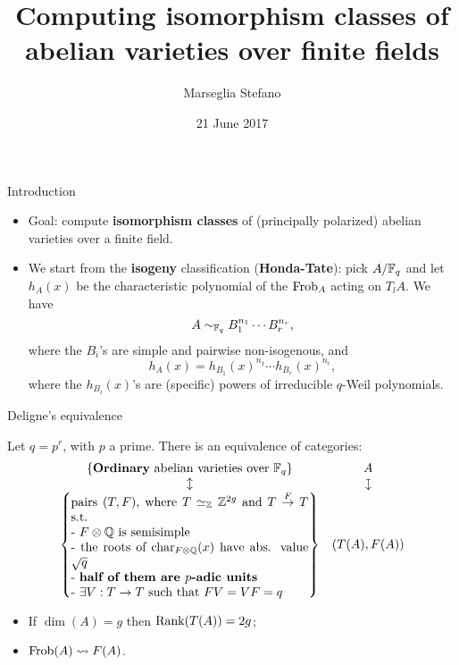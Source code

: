 \documentclass[handout]{beamer}
\title[]{Computing isomorphism classes of abelian varieties over finite fields}
\author[Marseglia Stefano]{Marseglia Stefano}
\institute[]{Stockholms Universitet}
\date{21 June 2017}
\begin{document}
\begin{frame}
\titlepage
\end{frame}

\begin{frame}{ Introduction }
\begin{itemize}
 \item Goal: compute \textbf{isomorphism classes} of (principally polarized) abelian varieties over a finite field.
 \pause \item We start from the \textbf{isogeny} classification (\textbf{Honda-Tate}):
 pick $A/\mathbb{F}_q$ and let $h_A(x)$ be the characteristic polynomial of the $\operatorname{Frob}_A$ acting on $T_lA$. We have
 \[A\sim_{\mathbb{F}_q} B_1^{n_1}\cdots B_r^{n_r},\]
 where the $B_i$'s are simple and pairwise non-isogenous, and 
 \[h_A(x) = h_{B_1}(x)^{n_1}\cdots h_{B_r}(x)^{n_r},\]
 where the $h_{B_i}(x)$'s are (specific) powers of irreducible $q$-Weil polynomials.
\end{itemize}
\end{frame}

\begin{frame}{ Deligne's equivalence }
\begin{theorem}[Deligne '69]
Let $q=p^r$, with $p$ a prime. There is an equivalence of categories:
\[\begin{array}{cc}
\set{\text{\textbf{Ordinary} abelian varieties over $\F_q$}}	& A \\
\updownarrow							& \downmapsto \\
\set{\parbox[p]{19em}{pairs $(T,F)$, where $T\simeq_\Z \Z^{2g}$ and $T\overset{F}{\to} T$ s.t.\\
- $F\otimes \Q$ is semisimple\\
- the roots of $\Char_{F\otimes\Q}(x)$ have abs. value $\sqrt{q}$\\
- \textbf{half of them are $p$-adic units}\\
- $\exists V:T\to T$ such that $FV=VF=q$
}}	& (T(A),F(A))
\end{array}\]
\end{theorem}
\begin{remark}
\begin{itemize}
 \item If $\dim(A)=g$ then $\operatorname{Rank}(T(A))=2g$;
 \item $\operatorname{Frob}(A)\rightsquigarrow F(A)$.
\end{itemize}
\end{remark}
\end{frame}
\end{document}

